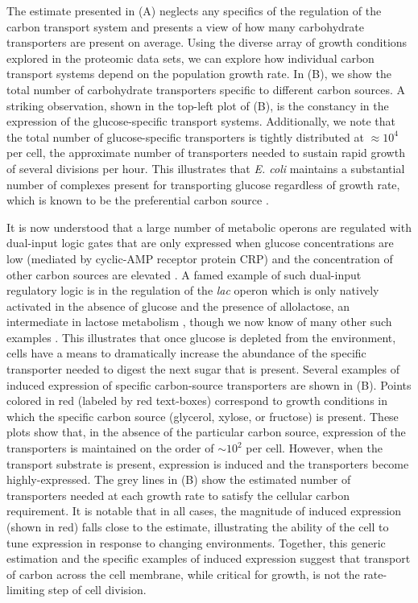 The estimate presented in (A) neglects any specifics of the
regulation of the carbon transport system and presents a  view of how
many carbohydrate transporters are present on average. Using the diverse array
of growth conditions explored in the proteomic data sets, we can explore how
individual carbon transport systems depend on the population growth rate. In
(B), we show the total number of carbohydrate transporters
specific to different carbon sources. A striking observation, shown in the
top-left plot of (B), is the constancy in the expression of the
glucose-specific transport systems. Additionally, we note that the total number
of glucose-specific transporters is tightly distributed at $\approx 10^4$ per cell,
the approximate number of transporters needed to sustain rapid growth of several
divisions per hour. This
illustrates that \textit{E. coli} maintains a substantial number of complexes
present for transporting glucose regardless of growth rate, which is known to be the preferential carbon
source \citep{monod1947, liu2005a, aidelberg2014}.

It is now understood that a large number of metabolic operons are regulated
with dual-input logic gates that are only expressed when glucose
concentrations are low (mediated by cyclic-AMP receptor protein CRP) and the
concentration of other carbon sources are elevated \citep{gama-castro2016,
zhang2014a}. A famed example of such dual-input regulatory logic is in the
regulation of the \textit{lac} operon which is only natively activated in the
absence of glucose and the presence of allolactose, an intermediate in
lactose metabolism \citep{jacob1961}, though we now know of many other such
examples \citep{ireland2020, gama-castro2016, belliveau2018}. This
illustrates that once glucose is depleted from the environment, cells have a
means to dramatically increase the abundance of the specific transporter
needed to digest the next sugar that is present. Several examples of induced
expression of specific carbon-source transporters are shown in
(B). Points colored in red (labeled by red text-boxes)
correspond to growth conditions in which the specific carbon source
(glycerol, xylose, or fructose) is present. These plots show that, in the
absence of the particular carbon source, expression of the transporters is
maintained on the order of $\sim 10^2$ per cell. However, when the transport
substrate is present, expression is induced and the transporters become
highly-expressed. The grey lines in (B) show the estimated
number of transporters needed at each growth rate to satisfy the cellular
carbon requirement. It is notable that in all cases, the magnitude of induced
expression (shown in red) falls close to the estimate, illustrating the
ability of the cell to tune expression in response to changing environments.
Together, this generic estimation and the specific examples of induced
expression suggest that transport of carbon across the cell membrane, while
critical for growth, is not the rate-limiting step of cell division.

